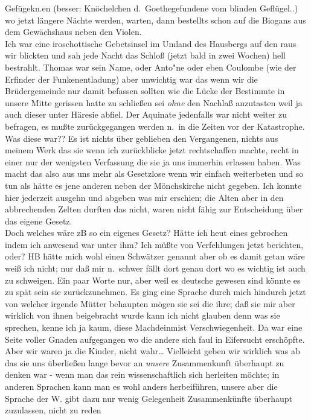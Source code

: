 \documentclass[
]{article}
\begin{document}
Gefügekn.en (besser: Knöchelchen d.~Goethegefundene vom blinden
Geflügel..) wo jetzt längere Nächte werden, warten, dann bestellts schon
auf die Biogans aus dem Gewächshaus neben den Violen.\\
Ich war eine iroschottische Gebetsinsel im Umland des Hausbergs auf den
raus wir blickten und sah jede Nacht das Schloß (jetzt bald in zwei
Wochen) hell bestrahlt. Thomas war sein Name, oder Anto"ne oder eben
Coulombe (wie der Erfinder der Funkenentladung) aber unwichtig war das
wenn wir die Brüdergemeinde nur damit befassen sollten wie die Lücke der
Bestimmte in unsere Mitte gerissen hatte zu schließen sei \emph{ohne}
den Nachlaß anzutasten weil ja auch dieser unter Häresie abfiel. Der
Aquinate jedenfalls war nicht weiter zu befragen, es mußte
zurückgegangen werden n.~in die Zeiten vor der Katastrophe. Was diese
war?? Es ist nichts über geblieben den Vergangenen, nichts aus meinem
Werk das sie wenn ich zurückblicke jetzt rechtschaffen machte, recht in
einer nur der wenigsten Verfassung die sie ja uns immerhin erlassen
haben. Was macht das also aus uns mehr als Gesetzlose wenn wir einfach
weiterbeten und so tun als hätte es jene anderen neben der Mönchskirche
nicht gegeben. Ich konnte hier jederzeit ausgehn und abgeben was mir
erschien; die Alten aber in den abbrechenden Zelten durften das nicht,
waren nicht fähig zur Entscheidung über das eigene Gesetz.\\
Doch welches wäre zB so ein eigenes Gesetz? Hätte ich heut eines
gebrochen indem ich anwesend war unter ihm? Ich müßte von Verfehlungen
jetzt berichten, oder? HB hätte mich wohl einen Schwätzer genannt aber
ob es damit getan wäre weiß ich nicht; nur daß mir n.~schwer fällt dort
genau dort wo es wichtig ist auch zu schweigen. Ein paar Worte nur, aber
weil es deutsche gewesen sind könnte es zu spät sein sie zurückzunehmen.
Es ging eine Sprache durch mich hindurch jetzt von welcher irgende
Mütter behaupten mögen sie sei die ihre; daß sie mir aber wirklich von
ihnen beigebracht wurde kann ich nicht glauben denn was sie sprechen,
kenne ich ja kaum, diese Machdeinmist Verschwiegenheit. Da war eine
Seite voller Gnaden aufgegangen wo die andere sich faul in Eifersucht
erschöpfte. Aber wir waren ja die Kinder, nicht wahr\ldots{} Vielleicht
geben wir wirklich was ab das sie uns überließen lange bevor an
\emph{unsere} Zusammenkunft überhaupt zu denken war - wenn man das rein
wissenschaftlich sich herleiten möchte; in anderen Sprachen kann man es
wohl anders herbeiführen, unsere aber die Sprache der W. gibt dazu nur
wenig Gelegenheit Zusammenkünfte überhaupt zuzulassen, nicht zu reden
\end{document}
